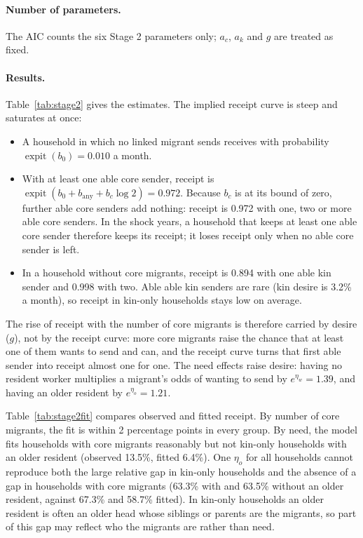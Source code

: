 \documentclass[11pt]{article}
\newcommand{\expit}{\operatorname{expit}}
\begin{document}
\paragraph{Number of parameters.} The AIC counts the six Stage 2 parameters only; $a_c$, $a_k$ and $g$ are treated as fixed.

\paragraph{Results.} Table~\ref{tab:stage2} gives the estimates. The implied receipt curve is steep and saturates at once:
\begin{itemize}[leftmargin=*]
\item A household in which no linked migrant sends receives with probability $\expit(b_0) = 0.010$ a month.
\item With at least one able core sender, receipt is $\expit(b_0 + b_{\text{any}} + b_c \log 2) = 0.972$. Because $b_c$ is at its bound of zero, further able core senders add nothing: receipt is 0.972 with one, two or more able core senders. In the shock years, a household that keeps at least one able core sender therefore keeps its receipt; it loses receipt only when no able core sender is left.
\item In a household without core migrants, receipt is 0.894 with one able kin sender and 0.998 with two. Able able kin senders are rare (kin desire is 3.2\% a month), so receipt in kin-only households stays low on average.
\end{itemize}
The rise of receipt with the number of core migrants is therefore carried by desire ($g$), not by the receipt curve: more core migrants raise the chance that at least one of them wants to send and can, and the receipt curve turns that first able sender into receipt almost one for one. The need effects raise desire: having no resident worker multiplies a migrant's odds of wanting to send by $e^{\eta_w} = 1.39$, and having an older resident by $e^{\eta_o} = 1.21$.

Table~\ref{tab:stage2fit} compares observed and fitted receipt. By number of core migrants, the fit is within 2 percentage points in every group. By need, the model fits households with core migrants reasonably but not kin-only households with an older resident (observed 13.5\%, fitted 6.4\%). One $\eta_o$ for all households cannot reproduce both the large relative gap in kin-only households and the absence of a gap in households with core migrants (63.3\% with and 63.5\% without an older resident, against 67.3\% and 58.7\% fitted). In kin-only households an older resident is often an older head whose siblings or parents are the migrants, so part of this gap may reflect who the migrants are rather than need.
\end{document}
